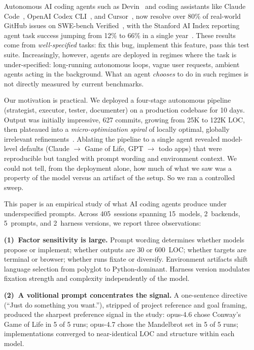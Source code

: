 \documentclass{article}
\begin{document}
Autonomous AI coding agents such as
Devin~\citep{cognition2024devin} and coding assistants like Claude
Code~\citep{anthropic2025claudecode}, OpenAI Codex
CLI~\citep{openai2025codex}, and
Cursor~\citep{cursor2024}, now resolve over 80\% of real-world
GitHub issues on SWE-bench
Verified~\citep{swebenchpro2026,jimenez2024swebench,yang2024sweagent},
with the Stanford AI Index reporting agent task success jumping
from 12\% to 66\% in a single year~\citep{stanforhai2026index}.
These results come from \emph{well-specified} tasks: fix this
bug, implement this feature, pass this test suite. Increasingly,
however, agents are deployed in regimes where the task is
under-specified: long-running autonomous loops, vague user
requests, ambient agents acting in the background. What an agent
\emph{chooses} to do in such regimes is not directly measured by
current benchmarks.

Our motivation is practical. We deployed a four-stage autonomous
pipeline (strategist, executor, tester, documenter) on a
production codebase for 10 days. Output was initially
impressive, 627 commits, growing from 25K to 122K LOC, then
plateaued into a \emph{micro-optimization spiral} of locally
optimal, globally irrelevant
refinements~\citep{christensen1997,simon1956}. Ablating the
pipeline to a single agent revealed model-level defaults
(Claude $\to$ Game of Life, GPT $\to$ todo apps) that were
reproducible but tangled with prompt wording and environment
context. We could not tell, from the deployment alone, how much
of what we saw was a property of the model versus an artifact of
the setup. So we ran a controlled sweep.

This paper is an empirical study of what AI coding agents
produce under underspecified prompts. Across 405~sessions
spanning 15~models, 2~backends, 5~prompts, and 2~harness
versions, we report three observations:

\textbf{(1)~Factor sensitivity is large.} Prompt wording
determines whether models propose or implement; whether outputs
are 30 or 600~LOC; whether targets are terminal or browser;
whether runs fixate or diversify. Environment artifacts shift
language selection from polyglot to Python-dominant. Harness
version modulates fixation strength and complexity
independently of the model.

\textbf{(2)~A volitional prompt concentrates the signal.} A
one-sentence directive (``Just do something you want.''),
stripped of project reference and goal framing, produced the
sharpest preference signal in the study: opus-4.6 chose
Conway's Game of Life in 5 of 5 runs; opus-4.7 chose the
Mandelbrot set in 5 of 5 runs; implementations converged to
near-identical LOC and structure within each model.
\end{document}
